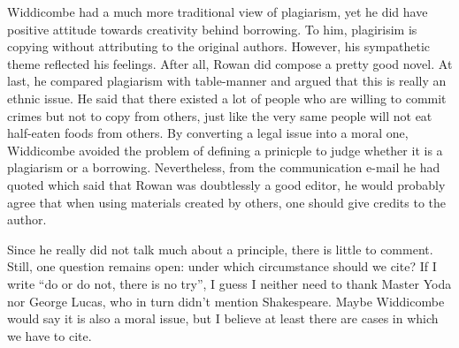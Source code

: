 \documentclass{writing}
\begin{document}
Widdicombe had a much more traditional view of plagiarism, yet he did
have positive attitude towards creativity behind borrowing. To him,
plagirisim is copying without attributing to the original authors.
However, his sympathetic theme reflected his feelings. After all, Rowan
did compose a pretty good novel. At last, he compared plagiarism with
table-manner and argued that this is really an ethnic issue. He said
that there existed a lot of people who are willing to commit crimes but
not to copy from others, just like the very same people will not eat
half-eaten foods from others. By converting a legal issue into a moral
one, Widdicombe avoided the problem of defining a prinicple to judge
whether it is a plagiarism or a borrowing. Nevertheless, from the
communication e-mail he had quoted which said that Rowan was doubtlessly
a good editor, he would probably agree that when using materials created
by others, one should give credits to the author.

Since he really did not talk much about a principle, there is little to
comment. Still, one question remains open: under which circumstance
should we cite? If I write ``do or do not, there is no try'', I guess I
neither need to thank Master Yoda nor George Lucas, who in turn didn't
mention Shakespeare. Maybe Widdicombe would say it is also a moral
issue, but I believe at least there are cases in which we have to cite.
\end{document}
